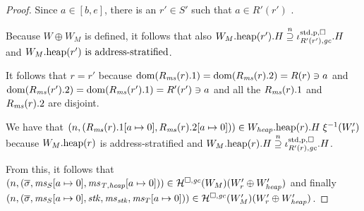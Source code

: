 \begin{proof}
  Since $a \in [b,e]$, there is an $r' \in S'$ such that $a \in R'(r')$ .

  Because $W \oplus W_M$ is defined, it follows that also
  $\pwheap[W_M](r').H \nsupeq \stdreg{R'(r'),\gc}{\pur}.H$ and
  $\pwheap[W_M](r') \text{ is address-stratified}$.

  It follows that $r = r'$ because $\dom(R_\ms(r).1) = \dom(R_\ms(r).2) = R(r) \ni a$ and $\dom(R_\ms(r').2) = \dom(R_\ms(r').1) = R'(r') \ni a$ and all the $R_\ms(r).1$ and $R_\ms(r).2$ are disjoint.

  We have that $\npair{(R_\ms(r).1\update{a}{0},R_\ms(r).2\update{a}{0})} \in \pwheap[W_\var{heap}](r).H \; \xi^{-1}(W_r')$ because $\pwheap[W_M](r)$ is address-stratified and $\pwheap[W_M](r).H \nsupeq \stdreg{R'(r),\gc}{\pur}.H$.

  From this, it follows that $\npair{(\overline{\sigma},\ms_S\update{a}{0},\ms_\var{T,heap}\update{a}{0})} \in \lrheap(W_M)(W_r' \oplus W_\var{heap}')$ and finally $\npair{(\overline{\sigma},\ms_S\update{a}{0},\stk,\ms_\stk,\ms_T\update{a}{0})} \in \lrheap(W_M')(W_r' \oplus W_{\var{heap}}')$.
\end{proof}

